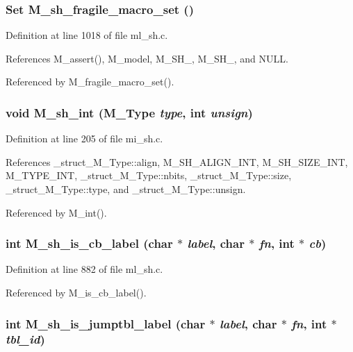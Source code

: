 \subsubsection{\setlength{\rightskip}{0pt plus 5cm}\bf{Set} M\_\-sh\_\-fragile\_\-macro\_\-set ()}\label{m__sh_8h_9976636730a2cb3c898f497672b4ae7d}




Definition at line 1018 of file ml\_\-sh.c.

References M\_\-assert(), M\_\-model, M\_\-SH\_, M\_\-SH\_, and NULL.

Referenced by M\_\-fragile\_\-macro\_\-set().
\subsubsection{\setlength{\rightskip}{0pt plus 5cm}void M\_\-sh\_\-int (\bf{M\_\-Type} {\em type}, int {\em unsign})}\label{m__sh_8h_8ff9869c75b2c937e123ceda8e06c33f}




Definition at line 205 of file mi\_\-sh.c.

References \_\-struct\_\-M\_\-Type::align, M\_\-SH\_\-ALIGN\_\-INT, M\_\-SH\_\-SIZE\_\-INT, M\_\-TYPE\_\-INT, \_\-struct\_\-M\_\-Type::nbits, \_\-struct\_\-M\_\-Type::size, \_\-struct\_\-M\_\-Type::type, and \_\-struct\_\-M\_\-Type::unsign.

Referenced by M\_\-int().
\subsubsection{\setlength{\rightskip}{0pt plus 5cm}int M\_\-sh\_\-is\_\-cb\_\-label (char $\ast$ {\em label}, char $\ast$ {\em fn}, int $\ast$ {\em cb})}\label{m__sh_8h_65448f776a10b0e627aa2002ba8bcc41}




Definition at line 882 of file ml\_\-sh.c.

Referenced by M\_\-is\_\-cb\_\-label().
\subsubsection{\setlength{\rightskip}{0pt plus 5cm}int M\_\-sh\_\-is\_\-jumptbl\_\-label (char $\ast$ {\em label}, char $\ast$ {\em fn}, int $\ast$ {\em tbl\_\-id})}\label{m__sh_8h_20c05e67a4f84001f8991217ca1f4093}




